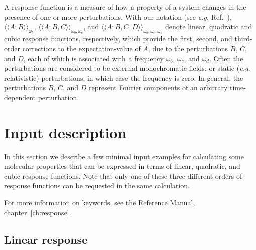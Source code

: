 A response function is a measure of how a property of a system changes in
the presence of one or more perturbations. With our notation (see {\it e.g.\/}
Ref.~\cite{jopjjcp82}),  $\langle\!\langle A;B\rangle\!\rangle_{\omega_b}$,
$\langle\!\langle A;B,C\rangle\!\rangle_{\omega_b,\omega_c}$, and 
$\langle\!\langle A;B,C,D\rangle\!\rangle_{\omega_b,\omega_c,\omega_d}$
denote linear, quadratic and cubic response
functions, respectively, which
provide the first, second, and third-order corrections to the
expectation-value of $A$, due to the perturbations $B$, $C$, and $D$, each of
which is associated with a frequency $\omega_b$, $\omega_c$, and
$\omega_d$. Often the perturbations are considered to be 
external monochromatic fields, or static ({\it e.g.\/} relativistic) perturbations,
in which case the frequency is zero.   In general, the perturbations $B$,
$C$, and $D$ represent Fourier components of an arbitrary time-dependent
perturbation.

\section{Input description}
\label{sec:rspex}
 
In this section we describe a few minimal input examples for calculating some
molecular properties that can be expressed in terms of linear, quadratic, and
cubic response functions.
Note that only one of these three different orders of response functions can be
requested in the same calculation.

For more information on keywords, see the Reference Manual, chapter~\ref{ch:response}.
 
\subsection{Linear response}
\label{subsec:linrsp}

